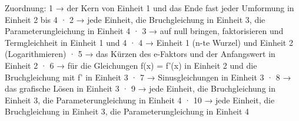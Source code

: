
Zuordnung: 1 → der Kern von Einheit 1 und das Ende fast jeder Umformung in Einheit 2 bis 4 · 2 → jede Einheit, die Bruchgleichung in Einheit 3, die Parameterungleichung in Einheit 4 · 3 → auf null bringen, faktorisieren und Termgleichheit in Einheit 1 und 4 · 4 → Einheit 1 (n-te Wurzel) und Einheit 2 (Logarithmieren) · 5 → das Kürzen des e-Faktors und der Anfangswert in Einheit 2 · 6 → für die Gleichungen f(x) = f'(x) in Einheit 2 und die Bruchgleichung mit f' in Einheit 3 · 7 → Sinusgleichungen in Einheit 3 · 8 → das grafische Lösen in Einheit 3 · 9 → jede Einheit, die Bruchgleichung in Einheit 3, die Parameterungleichung in Einheit 4 · 10 → jede Einheit, die Bruchgleichung in Einheit 3, die Parameterungleichung in Einheit 4

